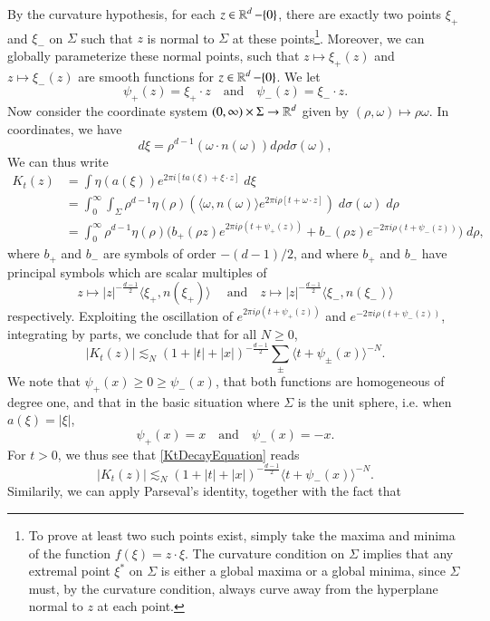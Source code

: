 By the curvature hypothesis, for each $z \in \operatorname{\mathbb{R}}^d - \{ 0 \}$, there are exactly two points $\xi_+$ and $\xi_-$ on $\Sigma$ such that $z$ is normal to $\Sigma$ at these points\footnote{To prove at least two such points exist, simply take the maxima and minima of the function $f(\xi) = z \cdot \xi$. The curvature condition on $\Sigma$ implies that any extremal point $\xi^*$ on $\Sigma$ is either a global maxima or a global minima, since $\Sigma$ must, by the curvature condition, always curve away from the hyperplane normal to $z$ at each point.}. Moreover, we can globally parameterize these normal points, such that $z \mapsto \xi_+(z)$ and $z \mapsto \xi_-(z)$ are smooth functions for $z \in \operatorname{\mathbb{R}}^d - \{ 0 \}$. We let
%
\[ \psi_+(z) = \xi_+ \cdot z \quad\text{and}\quad \psi_-(z) = \xi_- \cdot z. \]
%
Now consider the coordinate system $(0,\infty) \times \Sigma \to \operatorname{\mathbb{R}}^d$ given by $(\rho,\omega) \mapsto \rho \omega$. In coordinates, we have
%
\[ d\xi = \rho^{d-1} (\omega \cdot n(\omega)) d\rho d\sigma(\omega), \]
%
We can thus write
%
\begin{align*}
    K_t(z) &= \int \eta(a(\xi)) e^{2 \pi i [ t a(\xi) + \xi \cdot z ]}\; d\xi\\
    &= \int_0^\infty \int_\Sigma \rho^{d-1} \eta(\rho) \left( \langle \omega, n(\omega) \rangle e^{2 \pi i \rho [ t + \omega \cdot z ]} \right)\; d\sigma(\omega)\; d\rho\\
    &= \int_0^\infty \rho^{d-1} \eta(\rho) \Big( b_+(\rho z) e^{2 \pi i \rho (t + \psi_+(z))} + b_-(\rho z) e^{- 2 \pi i \rho (t + \psi_-(z))} \Big)\; d\rho,
\end{align*}
%
where $b_+$ and $b_-$ are symbols of order $-(d-1)/2$, and where $b_+$ and $b_-$ have principal symbols which are scalar multiples of
%
\[ z \mapsto |z|^{- \frac{d-1}{2}} \langle \xi_+, n(\xi_+) \rangle\; \quad\text{and}\quad z \mapsto |z|^{-\frac{d-1}{2}} \langle \xi_-, n(\xi_-) \rangle \]
%
respectively. Exploiting the oscillation of $e^{2 \pi i \rho (t + \psi_+(z))}$ and $e^{-2 \pi i \rho (t + \psi_-(z))}$, integrating by parts, we conclude that for all $N \geq 0$,
%
\begin{equation} \label{KtDecayEquation}
    |K_t(z)| \lesssim_N (1 + |t| + |x|)^{- \frac{d-1}{2}} \sum_{\pm} \langle t + \psi_{\pm}(x) \rangle^{-N}.
\end{equation}
%
We note that $\psi_+(x) \geq 0 \geq \psi_-(x)$, that both functions are homogeneous of degree one, and that in the basic situation where $\Sigma$ is the unit sphere, i.e. when $a(\xi) = |\xi|$,
%
\[ \psi_+(x) = x \quad\text{and}\quad \psi_-(x) = -x. \]
%
For $t > 0$, we thus see that \eqref{KtDecayEquation} reads
%
\[ |K_t(z)| \lesssim_N (1 + |t| + |x|)^{- \frac{d-1}{2}} \langle t + \psi_-(x) \rangle^{-N}. \]
%
Similarily, we can apply Parseval's identity, together with the fact that

